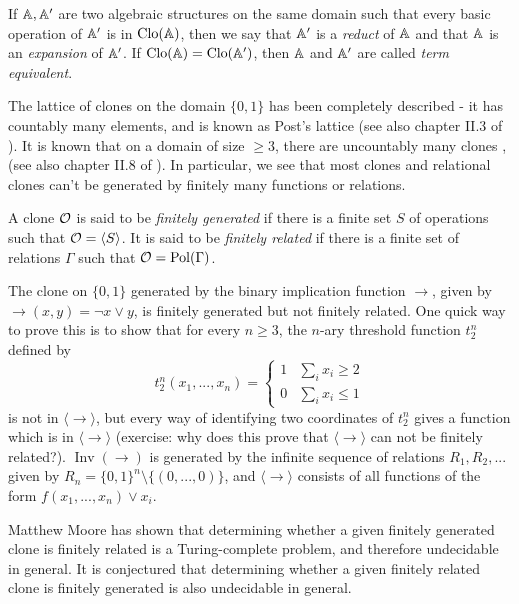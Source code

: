 \documentclass[letterpaper,11pt]{article}
\DeclareMathOperator{\Clo}{Clo}
\DeclareMathOperator{\Pol}{Pol}
\DeclareMathOperator{\Inv}{Inv}
\begin{document}
\begin{defn} If $\mathbb{A}, \mathbb{A}'$ are two algebraic structures on the same domain such that every basic operation of $\mathbb{A}'$ is in $\Clo(\bA)$, then we say that $\mathbb{A}'$ is a \emph{reduct} of $\mathbb{A}$ and that $\mathbb{A}$ is an \emph{expansion} of $\mathbb{A}'$. If $\Clo(\bA) = \Clo(\bA')$, then $\mathbb{A}$ and $\mathbb{A}'$ are called \emph{term equivalent}.
\end{defn}

The lattice of clones on the domain $\{0,1\}$ has been completely described - it has countably many elements, and is known as Post's lattice \cite{post-lattice} (see also chapter II.3 of \cite{lau-clone-theory}). It is known that on a domain of size $\ge 3$, there are uncountably many clones \cite{uncountable-clones}, \cite{zhuk-selfdual} (see also chapter II.8 of \cite{lau-clone-theory}). In particular, we see that most clones and relational clones can't be generated by finitely many functions or relations.

\begin{defn} A clone $\mathcal{O}$ is said to be \emph{finitely generated} if there is a finite set $S$ of operations such that $\mathcal{O} = \langle S \rangle$. It is said to be \emph{finitely related} if there is a finite set of relations $\Gamma$ such that $\cO = \Pol(\Gamma)$.
\end{defn}

\begin{ex}\label{ex-non-finitely-related} The clone on $\{0,1\}$ generated by the binary implication function $\to$, given by $\operatorname{\to}(x,y) = \neg x \vee y$, is finitely generated but not finitely related. One quick way to prove this is to show that for every $n \ge 3$, the $n$-ary threshold function $t_2^n$ defined by
\[
t_2^n(x_1, ..., x_n) = \begin{cases} 1 & \sum_i x_i \ge 2\\ 0 & \sum_i x_i \le 1\end{cases}
\]
is not in $\langle \to \rangle$, but every way of identifying two coordinates of $t_2^n$ gives a function which is in $\langle \to \rangle$ (exercise: why does this prove that $\langle \to \rangle$ can not be finitely related?). $\Inv(\to)$ is generated by the infinite sequence of relations $R_1, R_2, ...$ given by $R_n = \{0,1\}^n \setminus \{(0, ..., 0)\}$, and $\langle\to\rangle$ consists of all functions of the form $f(x_1, ..., x_n)\vee x_i$.
\end{ex}

Matthew Moore \cite{finitely-related-undecidable} has shown that determining whether a given finitely generated clone is finitely related is a Turing-complete problem, and therefore undecidable in general. It is conjectured that determining whether a given finitely related clone is finitely generated is also undecidable in general.
\end{document}
